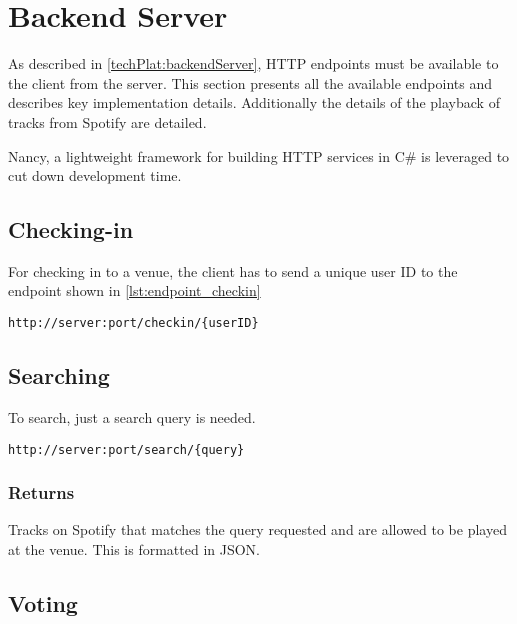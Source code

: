 \section{Backend Server}
\label{imp:backendServer}

As described in \cref{techPlat:backendServer}, HTTP endpoints must be
available to the client from the server. This section presents all the
available endpoints and describes key implementation
details. Additionally the details of the playback of tracks from
Spotify are detailed.

Nancy, a lightweight framework for building HTTP services in C\# is leveraged
to cut down development time.


\subsection{Checking-in}
For checking in to a venue, the client has to send a unique user ID to
the endpoint shown in \cref{lst:endpoint_checkin}

\begin{lstlisting}[label={lst:endpoint_checkin}, caption={HTTP endpoint allowing client to check-in to a venue. Text surrounded by curly brackets are parameters.}]
http://server:port/checkin/{userID}
\end{lstlisting}

\subsection{Searching}
To search, just a search query is needed.

\begin{lstlisting}[label={lst:endpoint_search}, caption={Text surrounded by curly brackets are parameters.}]
http://server:port/search/{query}
\end{lstlisting}

\subsubsection{Returns}
Tracks on Spotify that matches the query requested and are allowed to
be played at the venue. This is formatted in JSON.

\subsection{Voting}

